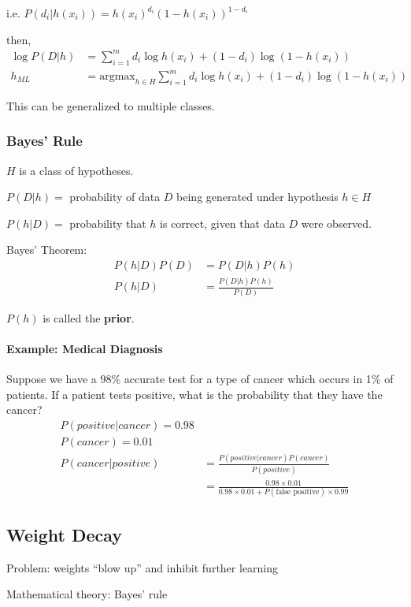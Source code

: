 i.e. $P(d_i | h(x_i)) = h(x_i)^{d_i} (1 - h(x_i))^{1 - d_i}$

then,
\begin{align*}
    \log P(D|h) &= \sum_{i = 1}^m d_i \log h(x_i) + (1 - d_i)\log (1-h(x_i))\\
    h_{ML} &= \text{argmax}_{h \in H} \sum_{i = 1}^m d_i \log h(x_i) + (1 - d_i)\log (1 - h(x_i))
\end{align*}

This can be generalized to multiple classes.

\subsubsection{Bayes' Rule}
$H$ is a class of hypotheses.

$P(D|h) = $ probability of data $D$ being generated under hypothesis $h \in H$

$P(h|D) = $ probability that $h$ is correct, given that data $D$ were observed.

Bayes' Theorem:
\begin{align*}
    P(h|D)P(D) &= P(D|h)P(h)\\
    P(h|D) &= \frac{P(D|h)P(h)}{P(D)}
\end{align*}

$P(h)$ is called the \textbf{prior}.

\paragraph{Example: Medical Diagnosis}
Suppose we have a 98\% accurate test for a type of cancer which occurs in 1\%
of patients. If a patient tests positive, what is the probability that they
have the cancer?
\begin{align*}
    P(positive|cancer) = 0.98\\
    P(cancer) = 0.01\\
    P(cancer|positive) &= \frac{P(positive|cancer)P(cancer)}{P(positive)}\\
                       &= \frac{0.98 \times 0.01}{0.98 \times 0.01 + P(\text{false positive}) \times 0.99}
\end{align*}

\subsection{Weight Decay}
Problem: weights ``blow up'' and inhibit further learning

Mathematical theory: Bayes' rule

